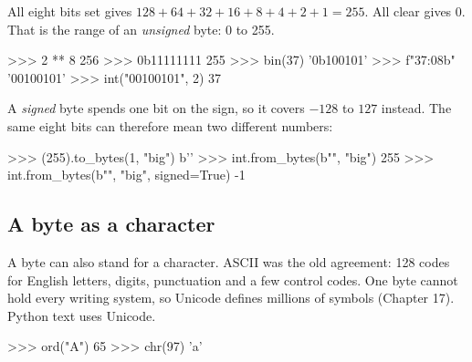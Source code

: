 \begin{center}
\end{center}

All eight bits set gives $128+64+32+16+8+4+2+1 = 255$. All clear gives 0.
That is the range of an \emph{unsigned} byte: 0 to 255.

\begin{pycode}
>>> 2 ** 8
256
>>> 0b11111111
255
>>> bin(37)
'0b100101'
>>> f"{37:08b}"
'00100101'
>>> int("00100101", 2)
37
\end{pycode}

A \emph{signed} byte spends one bit on the sign, so it covers $-128$ to $127$ instead.
The same eight bits can therefore mean two different numbers:

\begin{pycode}
>>> (255).to_bytes(1, "big")
b'\xff'
>>> int.from_bytes(b"\xff", "big")
255
>>> int.from_bytes(b"\xff", "big", signed=True)
-1
\end{pycode}

\subsection{A byte as a character}

A byte can also stand for a character. ASCII was the old agreement: 128 codes for English letters,
digits, punctuation and a few control codes. One byte cannot hold every writing
system, so Unicode defines millions of symbols (Chapter 17). Python text uses Unicode.

\begin{pycode}
>>> ord("A")
65
>>> chr(97)
'a'
\end{pycode}

